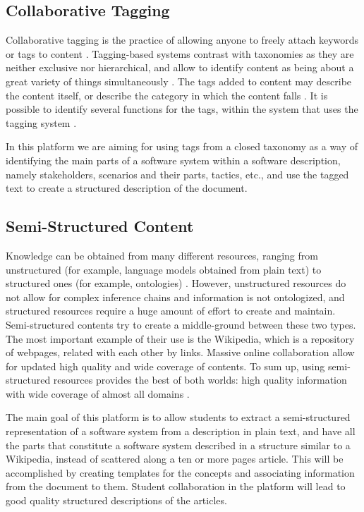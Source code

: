 \documentclass[conference]{IEEEtran}
\begin{document}
\subsection{Collaborative Tagging}
Collaborative tagging is the practice of allowing anyone to freely attach keywords or tags to content \cite{golder2006usage}. Tagging-based systems contrast with taxonomies as they are neither exclusive nor hierarchical, and allow to identify content as being about a great variety of things simultaneously \cite{golder2006usage}. The tags added to content may describe the content itself, or describe the category in which the content falls \cite{coates2005two}. It is possible to identify several functions for the tags, within the system that uses the tagging system \cite{golder2006usage}.

In this platform we are aiming for using tags from a closed taxonomy as a way of identifying the main parts of a software system within a software description, namely stakeholders, scenarios and their parts, tactics, etc., and use the tagged text to create a structured description of the document.

\subsection{Semi-Structured Content}
Knowledge can be obtained from many different resources, ranging from unstructured (for example, language models obtained from plain text) to structured ones (for example, ontologies) \cite{hovy2013collaboratively}. However, unstructured resources do not allow for complex inference chains\cite{domingos2007toward} and information is not ontologized\cite{hovy2013collaboratively}, and structured resources require a huge amount of effort to create and maintain\cite{hovy2013collaboratively}. Semi-structured contents try to create a middle-ground between these two types. The most important example of their use is the Wikipedia, which is a repository of webpages, related with each other by links. Massive online collaboration allow for updated high quality and wide coverage of contents. To sum up, using semi-structured resources provides the best of both worlds: high quality information with wide coverage of almost all domains \cite{hovy2013collaboratively}.
 
The main goal of this platform is to allow students to extract a semi-structured representation of a software system from a description in plain text, and have all the parts that constitute a software system described in a structure similar to a Wikipedia, instead of scattered along a ten or more pages article. This will be accomplished by creating templates for the concepts and associating information from the document to them. Student collaboration in the platform will lead to good quality structured descriptions of the articles.
	
\end{document}
